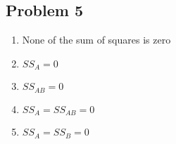 \documentclass{article}
\begin{document}
    \subsection{Problem 5}


    \begin{enumerate}
\def\labelenumi{\arabic{enumi}.}
\itemsep1pt\parskip0pt
\item
  None of the sum of squares is zero
\item
  \(SS_A = 0\)
\item
  \(SS_{AB} = 0\)
\item
  \(SS_A = SS_{AB} = 0\)
\item
  \(SS_A = SS_B = 0\)
\end{enumerate}


    
    
    
    
\end{document}

